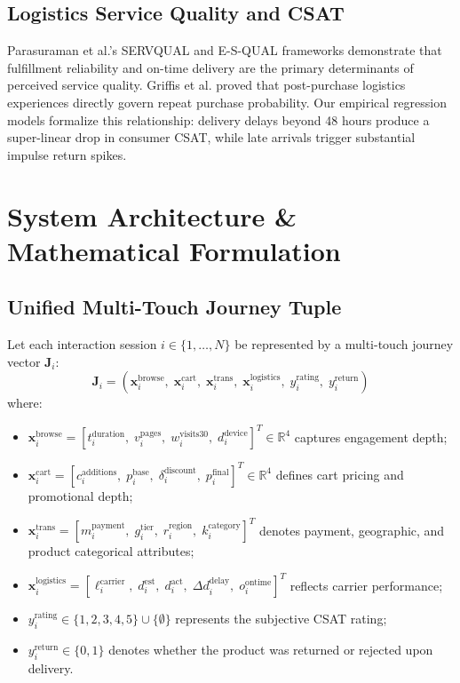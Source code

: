 \documentclass[conference]{IEEEtran}
\begin{document}
\subsection{Logistics Service Quality and CSAT}
Parasuraman et al.'s SERVQUAL \cite{parasuraman1988servqual} and E-S-QUAL \cite{parasuraman2005e} frameworks demonstrate that fulfillment reliability and on-time delivery are the primary determinants of perceived service quality. Griffis et al. \cite{griffis2012linking} proved that post-purchase logistics experiences directly govern repeat purchase probability. Our empirical regression models formalize this relationship: delivery delays beyond 48 hours produce a super-linear drop in consumer CSAT, while late arrivals trigger substantial impulse return spikes.

\section{System Architecture \& Mathematical Formulation}

\subsection{Unified Multi-Touch Journey Tuple}
Let each interaction session $i \in \{1, \dots, N\}$ be represented by a multi-touch journey vector $\mathbf{J}_i$:
\begin{equation}
\mathbf{J}_i = \left( \mathbf{x}_i^{\text{browse}}, \; \mathbf{x}_i^{\text{cart}}, \; \mathbf{x}_i^{\text{trans}}, \; \mathbf{x}_i^{\text{logistics}}, \; y_i^{\text{rating}}, \; y_i^{\text{return}} \right)
\end{equation}
where:
\begin{itemize}
    \item $\mathbf{x}_i^{\text{browse}} = [t_i^{\text{duration}}, \; v_i^{\text{pages}}, \; w_i^{\text{visits30}}, \; d_i^{\text{device}}]^T \in \mathbb{R}^4$ captures engagement depth;
    \item $\mathbf{x}_i^{\text{cart}} = [c_i^{\text{additions}}, \; p_i^{\text{base}}, \; \delta_i^{\text{discount}}, \; p_i^{\text{final}}]^T \in \mathbb{R}^4$ defines cart pricing and promotional depth;
    \item $\mathbf{x}_i^{\text{trans}} = [m_i^{\text{payment}}, \; g_i^{\text{tier}}, \; r_i^{\text{region}}, \; k_i^{\text{category}}]^T$ denotes payment, geographic, and product categorical attributes;
    \item $\mathbf{x}_i^{\text{logistics}} = [\ell_i^{\text{carrier}}, \; d_i^{\text{est}}, \; d_i^{\text{act}}, \; \Delta d_i^{\text{delay}}, \; o_i^{\text{ontime}}]^T$ reflects carrier performance;
    \item $y_i^{\text{rating}} \in \{1, 2, 3, 4, 5\} \cup \{\emptyset\}$ represents the subjective CSAT rating;
    \item $y_i^{\text{return}} \in \{0, 1\}$ denotes whether the product was returned or rejected upon delivery.
\end{itemize}
\end{document}
